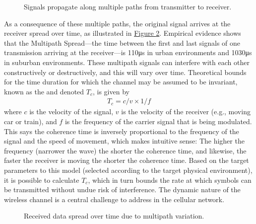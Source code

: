 \documentclass[a4paper,11pt,english]{sphinxmanual}
\let\sphinxpxdimen\pdfpxdimen\else\newdimen\sphinxpxdimen
\begin{document}
\begin{figure}[ht]
\centering
\capstart

\noindent\sphinxincludegraphics[width=600\sphinxpxdimen]{{Slide10}.png}
\caption{Signals propagate along multiple paths from
transmitter to receiver.}\label{\detokenize{primer:id6}}\label{\detokenize{primer:fig-multipath}}\end{figure}

\sphinxAtStartPar
As a consequence of these multiple paths, the original signal arrives at
the receiver spread over time, as illustrated in
\hyperref[\detokenize{primer:fig-coherence}]{Figure \ref{\detokenize{primer:fig-coherence}}}. Empirical evidence shows that the
Multipath Spread—the time between the first and last signals of one
transmission arriving at the receiver—is 1\sphinxhyphen{}10μs in urban
environments and 10\sphinxhyphen{}30μs in suburban environments. These multipath
signals can interfere with each other constructively or destructively,
and this will vary over time. Theoretical
bounds for the time duration for which the channel may be assumed to
be invariant, known as the  and denoted
\(T_c\), is given by
\begin{equation*}
\begin{split}T_c =c/v \times 1/f\end{split}
\end{equation*}
\sphinxAtStartPar
where \(c\) is the velocity of the signal, \(v\) is the
velocity of the receiver (e.g., moving car or train), and \(f\) is
the frequency of the carrier signal that is being modulated. This
says the coherence time is inversely proportional to the frequency of
the signal and the speed of movement, which makes intuitive sense: The
higher the frequency (narrower the wave) the shorter the coherence time,
and likewise, the faster the receiver is moving the shorter the coherence
time. Based on the target parameters to this model (selected according
to the target physical environment), it is possible to calculate
\(T_c\), which in turn bounds the rate at which symbols can be
transmitted without undue risk of interference. The dynamic nature of
the wireless channel is a central challenge to address in the cellular
network.

\begin{figure}[ht]
\centering
\capstart

\noindent\sphinxincludegraphics[width=500\sphinxpxdimen]{{Slide11}.png}
\caption{Received data spread over time due to multipath
variation.}\label{\detokenize{primer:id7}}\label{\detokenize{primer:fig-coherence}}\end{figure}
\end{document}
